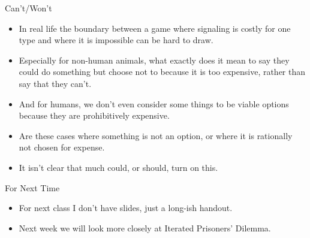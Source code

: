 \documentclass[
  ignorenonframetext,
]{beamer}
\providecommand{\tightlist}{%
  \setlength{\itemsep}{0pt}\setlength{\parskip}{0pt}}
\begin{document}
\begin{frame}{Can't/Won't}
\protect\hypertarget{cantwont}{}
\begin{itemize}
\tightlist
\item
  In real life the boundary between a game where signaling is costly for
  one type and where it is impossible can be hard to draw.
\item
  Especially for non-human animals, what exactly does it mean to say
  they could do something but choose not to because it is too expensive,
  rather than say that they can't.
\item
  And for humans, we don't even consider some things to be viable
  options because they are prohibitively expensive.
\item
  Are these cases where something is not an option, or where it is
  rationally not chosen for expense.
\item
  It isn't clear that much could, or should, turn on this.
\end{itemize}
\end{frame}

\begin{frame}{For Next Time}
\protect\hypertarget{for-next-time}{}
\begin{itemize}
\tightlist
\item
  For next class I don't have slides, just a long-ish handout.
\item
  Next week we will look more closely at Iterated Prisoners' Dilemma.
\end{itemize}
\end{frame}
\end{document}
